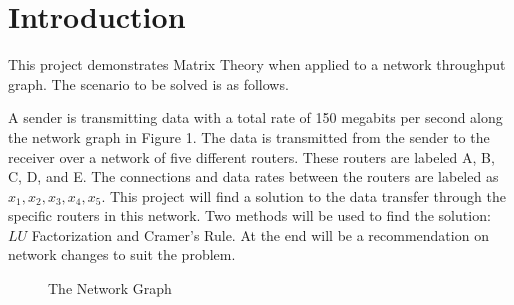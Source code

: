 \documentclass[paper.tex]{subfiles}
\begin{document}
\section{Introduction}

This project demonstrates Matrix Theory when applied to a network throughput graph.
The scenario to be solved is as follows.

A sender is transmitting data with a total rate of 150 megabits per second along the network graph in Figure 1.
The data is transmitted from the sender to the receiver over a network of five different routers.
These routers are labeled A, B, C, D, and E. The connections and data rates between the routers are labeled as $x_1, x_2, x_3, x_4, x_5$.
This project will find a solution to the data transfer through the specific routers in this network.
Two methods will be used to find the solution: $LU$ Factorization and Cramer's Rule.
At the end will be a recommendation on network changes to suit the problem.

\begin{figure}
    \begin{center}

\caption{The Network Graph}
\end{center}
\end{figure}
\end{document}
